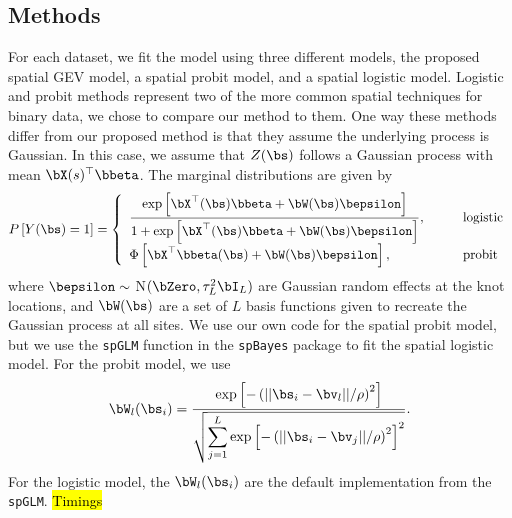 \subsection{Methods} \label{rbs:methods}
For each dataset, we fit the model using three different models, the proposed spatial GEV model, a spatial probit model, and a spatial logistic model.
Logistic and probit methods represent two of the more common spatial techniques for binary data, we chose to compare our method to them.
One way these methods differ from our proposed method is that they assume the underlying process is Gaussian.
In this case, we assume that $Z(\bs)$ follows a Gaussian process with mean $\bX(s)^\top \bbeta$.
The marginal distributions are given by
\begin{align}
  P\left[Y(\bs) = 1\right] = \left\{ \begin{array}{ll}
    \displaystyle \frac{\exp\left[\bX^\top(\bs) \bbeta + \bW (\bs) \bepsilon \right]}{1 + \exp\left[\bX^\top(\bs) \bbeta + \bW (\bs) \bepsilon \right]}, \qquad &\text{logistic}\\
    \Phi\left[\bX^\top \bbeta (\bs) + \bW (\bs) \bepsilon \right], \qquad &\text{probit}
  \end{array}\right.
\end{align}
where $\bepsilon \sim$ N$(\bZero, \tau^2_L \bI_L)$ are Gaussian random effects at the knot locations, and $\bW(\bs)$ are a set of $L$ basis functions given to recreate the Gaussian process at all sites.
We use our own code for the spatial probit model, but we use the \texttt{spGLM} function in the \texttt{spBayes} package \citep{Finley2015} to fit the spatial logistic model.
For the probit model, we use
\begin{align}
  \bW_l(\bs_i) = \frac{\exp\left[-\left(||\bs_i-\bv_l||/\rho\right)^2\right]}
                 {\sqrt{\displaystyle \sum_{j=1}^L\exp\left[-\left(||\bs_i-\bv_j||/\rho\right)^2\right]^2}}.
\end{align}
For the logistic model, the $\bW_l(\bs_i)$ are the default implementation from the \texttt{spGLM}.
\hl{Timings}


